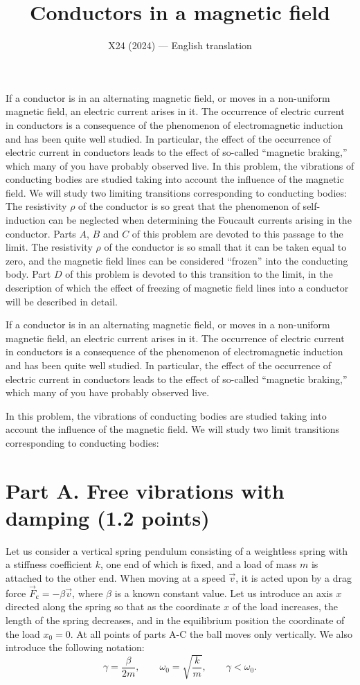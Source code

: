 \documentclass[11pt,a4paper]{article}
\title{\textbf{Conductors in a magnetic field}}
\author{\normalsize X24 (2024) --- English translation}
\date{}
\begin{document}
\maketitle

If a conductor is in an alternating magnetic field, or moves in a non-uniform magnetic field, an electric current arises in it. The occurrence of electric current in conductors is a consequence of the phenomenon of electromagnetic induction and has been quite well studied. In particular, the effect of the occurrence of electric current in conductors leads to the effect of so-called “magnetic braking,” which many of you have probably observed live. In this problem, the vibrations of conducting bodies are studied taking into account the influence of the magnetic field. We will study two limiting transitions corresponding to conducting bodies: The resistivity $\rho$ of the conductor is so great that the phenomenon of self-induction can be neglected when determining the Foucault currents arising in the conductor. Parts $A$, $B$ and $C$ of this problem are devoted to this passage to the limit. The resistivity $\rho$ of the conductor is so small that it can be taken equal to zero, and the magnetic field lines can be considered “frozen” into the conducting body. Part $D$ of this problem is devoted to this transition to the limit, in the description of which the effect of freezing of magnetic field lines into a conductor will be described in detail.

If a conductor is in an alternating magnetic field, or moves in a non-uniform magnetic field, an electric current arises in it. The occurrence of electric current in conductors is a consequence of the phenomenon of electromagnetic induction and has been quite well studied. In particular, the effect of the occurrence of electric current in conductors leads to the effect of so-called “magnetic braking,” which many of you have probably observed live.

In this problem, the vibrations of conducting bodies are studied taking into account the influence of the magnetic field. We will study two limit transitions corresponding to conducting bodies:

\section*{Part A. Free vibrations with damping (1.2 points)}

Let us consider a vertical spring pendulum consisting of a weightless spring with a stiffness coefficient $k$, one end of which is fixed, and a load of mass $m$ is attached to the other end. When moving at a speed $\vec{v}$, it is acted upon by a drag force $\vec{F}_{с}=-\beta\vec{v}$, where $\beta$ is a known constant value. Let us introduce an axis $x$ directed along the spring so that as the coordinate $x$ of the load increases, the length of the spring decreases, and in the equilibrium position the coordinate of the load $x_0=0$. At all points of parts $\mathrm{A}$-$\mathrm{C}$ the ball moves only vertically. We also introduce the following notation:
$$\gamma=\frac{\beta}{2m},\qquad \omega_0=\sqrt{\frac{k}{m}},\qquad \gamma<\omega_0.$$
\end{document}
